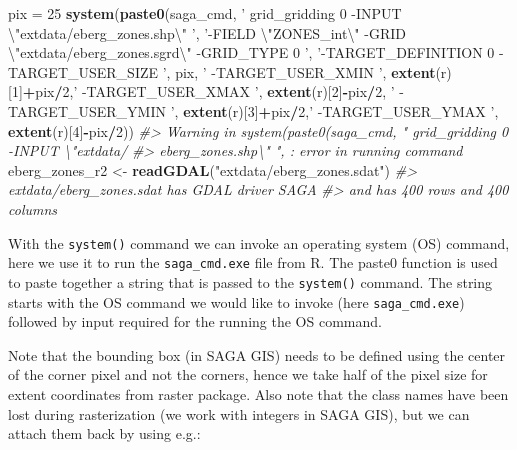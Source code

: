 \documentclass[11pt]{krantz}
\newenvironment{Shaded}{\begin{snugshade}}{\end{snugshade}}
\newcommand{\CharTok}[1]{\textcolor[rgb]{0.5,0.5,0.5}{#1}}
\newcommand{\CommentTok}[1]{\textcolor[rgb]{0.37,0.37,0.37}{\textit{#1}}}
\newcommand{\DecValTok}[1]{\textcolor[rgb]{0.06,0.06,0.06}{#1}}
\newcommand{\KeywordTok}[1]{\textcolor[rgb]{0.27,0.27,0.27}{\textbf{#1}}}
\newcommand{\NormalTok}[1]{#1}
\newcommand{\OperatorTok}[1]{\textcolor[rgb]{0.43,0.43,0.43}{\textbf{#1}}}
\newcommand{\StringTok}[1]{\textcolor[rgb]{0.5,0.5,0.5}{#1}}
\theoremstyle{definition}
\theoremstyle{definition}
\theoremstyle{definition}
\theoremstyle{remark}
\begin{document}
\begin{Shaded}
\begin{Highlighting}[]
\NormalTok{pix =}\StringTok{ }\DecValTok{25}
\KeywordTok{system}\NormalTok{(}\KeywordTok{paste0}\NormalTok{(saga_cmd, }\StringTok{' grid_gridding 0 -INPUT }\CharTok{\textbackslash{}"}\StringTok{extdata/eberg_zones.shp}\CharTok{\textbackslash{}"}\StringTok{ '}\NormalTok{,}
      \StringTok{'-FIELD }\CharTok{\textbackslash{}"}\StringTok{ZONES_int}\CharTok{\textbackslash{}"}\StringTok{ -GRID }\CharTok{\textbackslash{}"}\StringTok{extdata/eberg_zones.sgrd}\CharTok{\textbackslash{}"}\StringTok{ -GRID_TYPE 0 '}\NormalTok{,}
      \StringTok{'-TARGET_DEFINITION 0 -TARGET_USER_SIZE '}\NormalTok{, pix, }\StringTok{' -TARGET_USER_XMIN '}\NormalTok{, }
      \KeywordTok{extent}\NormalTok{(r)[}\DecValTok{1}\NormalTok{]}\OperatorTok{+}\NormalTok{pix}\OperatorTok{/}\DecValTok{2}\NormalTok{,}\StringTok{' -TARGET_USER_XMAX '}\NormalTok{, }\KeywordTok{extent}\NormalTok{(r)[}\DecValTok{2}\NormalTok{]}\OperatorTok{-}\NormalTok{pix}\OperatorTok{/}\DecValTok{2}\NormalTok{, }
      \StringTok{' -TARGET_USER_YMIN '}\NormalTok{, }\KeywordTok{extent}\NormalTok{(r)[}\DecValTok{3}\NormalTok{]}\OperatorTok{+}\NormalTok{pix}\OperatorTok{/}\DecValTok{2}\NormalTok{,}\StringTok{' -TARGET_USER_YMAX '}\NormalTok{, }
      \KeywordTok{extent}\NormalTok{(r)[}\DecValTok{4}\NormalTok{]}\OperatorTok{-}\NormalTok{pix}\OperatorTok{/}\DecValTok{2}\NormalTok{))}
\CommentTok{#> Warning in system(paste0(saga_cmd, " grid_gridding 0 -INPUT \textbackslash{}"extdata/}
\CommentTok{#> eberg_zones.shp\textbackslash{}" ", : error in running command}
\NormalTok{eberg_zones_r2 <-}\StringTok{ }\KeywordTok{readGDAL}\NormalTok{(}\StringTok{"extdata/eberg_zones.sdat"}\NormalTok{)}
\CommentTok{#> extdata/eberg_zones.sdat has GDAL driver SAGA }
\CommentTok{#> and has 400 rows and 400 columns}
\end{Highlighting}
\end{Shaded}

With the \texttt{system()} command we can invoke an operating system
(OS) command, here we use it to run the \texttt{saga\_cmd.exe} file from
R. The paste0 function is used to paste together a string that is passed
to the \texttt{system()} command. The string starts with the OS command
we would like to invoke (here \texttt{saga\_cmd.exe}) followed by input
required for the running the OS command.

Note that the bounding box (in SAGA GIS) needs to be defined using the
center of the corner pixel and not the corners, hence we take half of
the pixel size for extent coordinates from raster package. Also note
that the class names have been lost during rasterization (we work with
integers in SAGA GIS), but we can attach them back by using e.g.:
\end{document}
